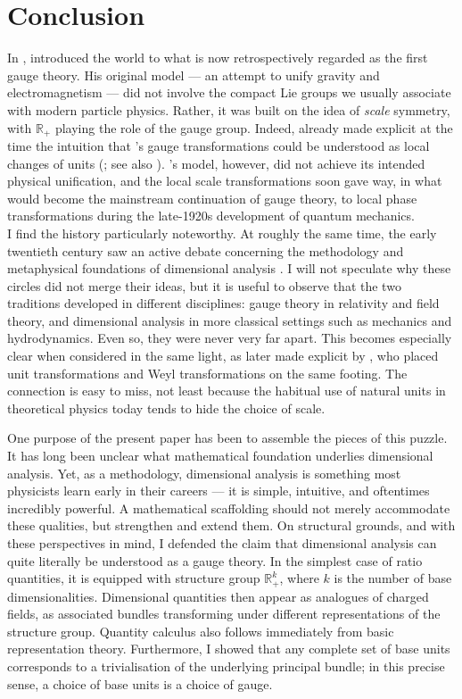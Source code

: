 \documentclass[12pt]{article}
\makeatletter
\numberwithin{equation}{section}
\newcommand{\R}{\mathbb{R}}
\newcommand*{\citelinktext}[2]{%
  \hyper@@link[cite]{}{cite.#1}{#2}}
\makeatother
\begin{document}
\section{Conclusion}
In \citeyear{Weyl1918}, \citelinktext{Weyl1918}{Hermann Weyl} introduced the world to what is now retrospectively regarded as the first gauge theory. His original model --- an attempt to unify gravity and electromagnetism --- did not involve the compact Lie groups we usually associate with modern particle physics. Rather, it was built on the idea of \emph{scale} symmetry, with $\R_+$ playing the role of the gauge group. Indeed, \citeauthor{Eddington1921} already made explicit at the time the intuition that \citeauthor{Weyl1918}'s gauge transformations could be understood as local changes of units (\citealp{Eddington1921}; see also \citealp[Sec.~85--86]{Eddington1923}). \citeauthor{Weyl1918}'s model, however, did not achieve its intended physical unification, and the local scale transformations soon gave way, in what would become the mainstream continuation of gauge theory, to local phase transformations during the late-1920s development of quantum mechanics.\\
I find the history particularly noteworthy. At roughly the same time, the early twentieth century saw an active debate concerning the methodology and metaphysical foundations of dimensional analysis \citep{Jalloh2024}. I will not speculate why these circles did not merge their ideas, but it is useful to observe that the two traditions developed in different disciplines: gauge theory in relativity and field theory, and dimensional analysis in more classical settings such as mechanics and hydrodynamics. Even so, they were never very far apart. This becomes especially clear when considered in the same light, as later made explicit by \citet{Dicke1962}, who placed unit transformations and Weyl transformations on the same footing. The connection is easy to miss, not least because the habitual use of natural units in theoretical physics today tends to hide the choice of scale.

One purpose of the present paper has been to assemble the pieces of this puzzle. It has long been unclear what mathematical foundation underlies dimensional analysis. Yet, as a methodology, dimensional analysis is something most physicists learn early in their careers --- it is simple, intuitive, and oftentimes incredibly powerful. A mathematical scaffolding should not merely accommodate these qualities, but strengthen and extend them. On structural grounds, and with these perspectives in mind, I defended the claim that dimensional analysis can quite literally be understood as a gauge theory. In the simplest case of ratio quantities, it is equipped with structure group $\R_+^k$, where $k$ is the number of base dimensionalities. Dimensional quantities then appear as analogues of charged fields, as associated bundles transforming under different representations of the structure group. Quantity calculus also follows immediately from basic representation theory. Furthermore, I showed that any complete set of base units corresponds to a trivialisation of the underlying principal bundle; in this precise sense, a choice of base units is a choice of gauge.
\end{document}
